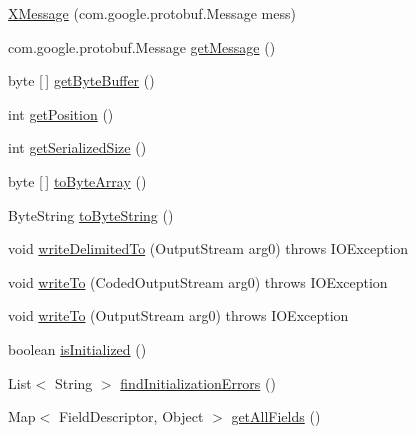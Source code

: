 \begin{DoxyCompactItemize}
\item 
\mbox{\hyperlink{classcom_1_1mysql_1_1cj_1_1protocol_1_1x_1_1_x_message_accb9da3722bf4c2d4aa5a2a8b4ee2148}{X\+Message}} (com.\+google.\+protobuf.\+Message mess)
\item 
com.\+google.\+protobuf.\+Message \mbox{\hyperlink{classcom_1_1mysql_1_1cj_1_1protocol_1_1x_1_1_x_message_aeee423ecdd94a3b495e3dd9ccb8778d4}{get\+Message}} ()
\item 
byte \mbox{[}$\,$\mbox{]} \mbox{\hyperlink{classcom_1_1mysql_1_1cj_1_1protocol_1_1x_1_1_x_message_ae2dfe8871615d85dbd7a8a7320a5025a}{get\+Byte\+Buffer}} ()
\item 
int \mbox{\hyperlink{classcom_1_1mysql_1_1cj_1_1protocol_1_1x_1_1_x_message_a5aa5c54128a10a7280a2113c4e24aeb9}{get\+Position}} ()
\item 
int \mbox{\hyperlink{classcom_1_1mysql_1_1cj_1_1protocol_1_1x_1_1_x_message_a9cdfba2d664db579fff825d5e8bc3001}{get\+Serialized\+Size}} ()
\item 
byte \mbox{[}$\,$\mbox{]} \mbox{\hyperlink{classcom_1_1mysql_1_1cj_1_1protocol_1_1x_1_1_x_message_aa3ee6552484b870aa7f5653807394509}{to\+Byte\+Array}} ()
\item 
Byte\+String \mbox{\hyperlink{classcom_1_1mysql_1_1cj_1_1protocol_1_1x_1_1_x_message_a646e0cdb01008b965425e68ce6a3c5a3}{to\+Byte\+String}} ()
\item 
void \mbox{\hyperlink{classcom_1_1mysql_1_1cj_1_1protocol_1_1x_1_1_x_message_a6e17de9d1c1c498712542be2a1fca39a}{write\+Delimited\+To}} (Output\+Stream arg0)  throws I\+O\+Exception 
\item 
void \mbox{\hyperlink{classcom_1_1mysql_1_1cj_1_1protocol_1_1x_1_1_x_message_a2e63f386593e452821ee6df4b81a8296}{write\+To}} (Coded\+Output\+Stream arg0)  throws I\+O\+Exception 
\item 
void \mbox{\hyperlink{classcom_1_1mysql_1_1cj_1_1protocol_1_1x_1_1_x_message_a03be15681b39a604afa4aca5945f0acf}{write\+To}} (Output\+Stream arg0)  throws I\+O\+Exception 
\item 
boolean \mbox{\hyperlink{classcom_1_1mysql_1_1cj_1_1protocol_1_1x_1_1_x_message_a2c151c970b8b7823c162e756fb1cebc6}{is\+Initialized}} ()
\item 
List$<$ String $>$ \mbox{\hyperlink{classcom_1_1mysql_1_1cj_1_1protocol_1_1x_1_1_x_message_a4427a4b4452284015fc8b4d1367d7da6}{find\+Initialization\+Errors}} ()
\item 
Map$<$ Field\+Descriptor, Object $>$ \mbox{\hyperlink{classcom_1_1mysql_1_1cj_1_1protocol_1_1x_1_1_x_message_a3415ace9c98273d7f9a43b09430bed32}{get\+All\+Fields}} ()

\end{DoxyCompactItemize}
